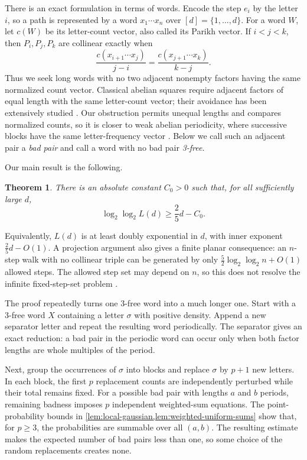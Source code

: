 \documentclass[11pt]{article}
\theoremstyle{plain}
\newtheorem{theorem}{Theorem}[section]
\theoremstyle{definition}
\theoremstyle{remark}
\begin{document}
There is an exact formulation in terms of words. Encode the step \(e_i\) by the letter \(i\), so a path is represented by a word \(x_1\cdots x_n\) over \([d]=\{1,\ldots,d\}\). For a word \(W\), let \(c(W)\) be its letter-count vector, also called its Parikh vector. If \(i<j<k\), then \(P_i,P_j,P_k\) are collinear exactly when
\[
 \frac{c(x_{i+1}\cdots x_j)}{j-i}
 =
 \frac{c(x_{j+1}\cdots x_k)}{k-j}.
\]
Thus we seek long words with no two adjacent nonempty factors having the same normalized count vector. Classical abelian squares require adjacent factors of equal length with the same letter-count vector; their avoidance has been extensively studied \cite{Dekking1979,Keranen1992,FiciPuzynina2023}. Our obstruction permits unequal lengths and compares normalized counts, so it is closer to weak abelian periodicity, where successive blocks have the same letter-frequency vector \cite{AvgustinovichPuzynina2016}. Below we call such an adjacent pair a \emph{bad pair} and call a word with no bad pair \emph{3-free}.

Our main result is the following.

\begin{theorem}\label{thm:main}
There is an absolute constant \(C_0>0\) such that, for all sufficiently large \(d\),
\begin{equation}\label{eq:main-loglog}
        \log_2\log_2 L(d)\ge \frac{2}{5}d-C_0.
\end{equation}
\end{theorem}

Equivalently, \(L(d)\) is at least doubly exponential in \(d\), with inner exponent \(\frac25d-O(1)\). A projection argument also gives a finite planar consequence: an \(n\)-step walk with no collinear triple can be generated by only \(\frac52\log_2\log_2 n+O(1)\) allowed steps. The allowed step set may depend on \(n\), so this does not resolve the infinite fixed-step-set problem \cite{ErdosProblems193}.

The proof repeatedly turns one 3-free word into a much longer one. Start with a 3-free word \(X\) containing a letter \(\sigma\) with positive density. Append a new separator letter and repeat the resulting word periodically. The separator gives an exact reduction: a bad pair in the periodic word can occur only when both factor lengths are whole multiples of the period.

Next, group the occurrences of \(\sigma\) into blocks and replace \(\sigma\) by \(p+1\) new letters. In each block, the first \(p\) replacement counts are independently perturbed while their total remains fixed. For a possible bad pair with lengths \(a\) and \(b\) periods, remaining badness imposes \(p\) independent weighted-sum equations. The point-probability bounds in \cref{lem:local-gaussian,lem:weighted-uniform-sums} show that, for \(p\ge3\), the probabilities are summable over all \((a,b)\). The resulting estimate makes the expected number of bad pairs less than one, so some choice of the random replacements creates none.
\end{document}
